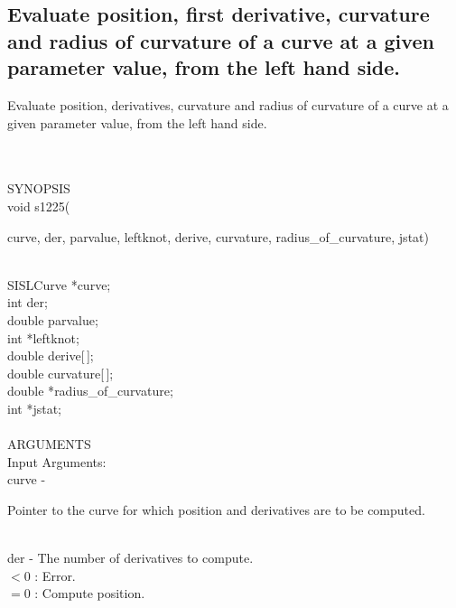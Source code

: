 \subsection{Evaluate position, first derivative, curvature and radius of curvature of a curve at a given parameter value, from the left hand side.}
\begin{minipg1}
Evaluate position, derivatives, curvature and radius of
               curvature of a curve at a given parameter value, from the
               left hand side.
\end{minipg1} \\ \\
SYNOPSIS\\
        \> void s1225(\begin{minipg3}
            {\fov curve}, {\fov der}, {\fov parvalue}, {\fov leftknot}, {\fov derive}, {\fov curvature},
	   radius\_of\_{\fov curvature}, {\fov jstat})
                \end{minipg3}\\
                \>\>    SISLCurve    \>  *{\fov curve};\\
                \>\>    int    \>  {\fov der};\\
                \>\>    double \> parvalue;\\
                \>\>    int    \>  *{\fov leftknot};\\
                \>\>    double \> derive[\,];\\
                \>\>    double \> curvature[\,];\\
                \>\>    double \> *{\fov radius}\_of\_curvature;\\
                \>\>    int    \>  *{\fov jstat};\\
\\
ARGUMENTS\\
	\>Input Arguments:\\
        \>\>    {\fov curve}\> - \>  \begin{minipg2}
                     Pointer to the curve for which position
                       and derivatives are to be computed.
                               \end{minipg2}\\
        \>\>    {\fov der}\> - \> The number of derivatives to compute. \\
	            \>\>\>\>\>          $ < 0$ : Error. \\
		    \>\>\>\>\>          $ = 0$ : Compute position.\\
